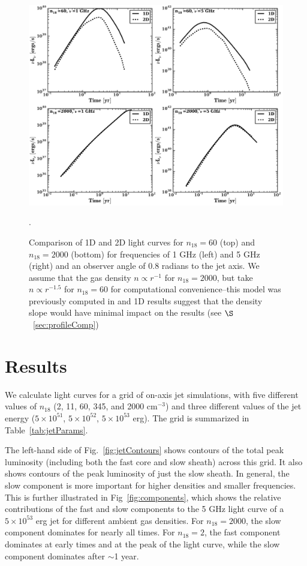 \documentclass[usenatbib,fleqn]{mnras}
\begin{document}
\begin{figure}
\includegraphics[width=16cm]{1D_2D.pdf}
\caption{\label{fig:1D2DB} Comparison of 1D and 2D light curves for
  $n_{18}=60$ (top) and $n_{18}=2000$ (bottom) for frequencies of 1
  GHz (left) and 5 GHz (right) and an observer angle of 0.8 radians to
  the jet axis. We assume that the gas density $n\propto r^{-1}$ for
  $n_{18}=2000$, but take $n\propto r^{-1.5}$ for $n_{18}=60$ for
  computational convenience--this model was previously computed in
  \citet{Mimica+2015} and 1D results suggest that the density slope
  would have minimal impact on the results (see
  $\S$~\ref{sec:profileComp})}.
\end{figure}

\section{Results}
\label{sec:results}
We calculate light curves for a grid of on-axis jet simulations, with
five different values of $n_{18}$ (2, 11, 60, 345, and 2000 cm$^{-3}$)
and three different values of the jet energy ($5\times 10^{51}$,
$5\times 10^{52}$, $5\times 10^{53}$ erg). The grid is summarized in
Table~\ref{tab:jetParams}.

The left-hand side of Fig.~\ref{fig:jetContours} shows contours of the
total peak luminosity (including both the fast core and slow sheath)
across this grid. It also shows contours of the peak luminosity of just
the slow sheath. In general, the slow component is more important for
higher densities and smaller frequencies.  This is further illustrated
in Fig~\ref{fig:components}, which shows the relative contributions of
the fast and slow components to the 5 GHz light curve of a $5 \times
10^{53}$ erg jet for different ambient gas densities. For
$n_{18}=2000$, the slow component dominates for nearly all times.  For
$n_{18}=2$, the fast component dominates at early times and at the
peak of the light curve, while the slow component dominates after
$\sim$1 year.
\end{document}
